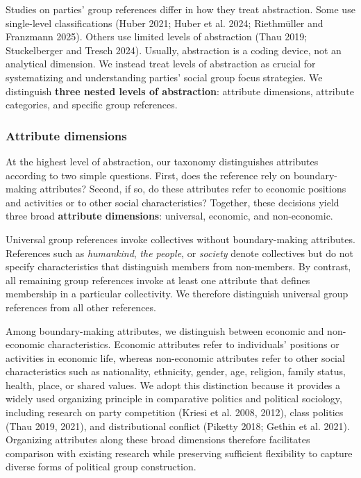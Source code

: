 \documentclass[12pt]{article}
\begin{document}
Studies on parties' group references differ in how they treat abstraction.
Some use single-level classifications (Huber 2021; Huber et al. 2024; Riethmüller and Franzmann 2025).
Others use limited levels of abstraction (Thau 2019; Stuckelberger and Tresch 2024).
Usually, abstraction is a coding device, not an analytical dimension.
We instead treat levels of abstraction as crucial for systematizing and understanding parties' social group focus strategies.
We distinguish \textbf{three nested levels of abstraction}: attribute dimensions, attribute categories, and specific group references.

\subsubsection{Attribute dimensions}\label{attribute-dimensions}

At the highest level of abstraction, our taxonomy distinguishes attributes according to two simple questions.
First, does the reference rely on boundary-making attributes?
Second, if so, do these attributes refer to economic positions and activities or to other social characteristics?
Together, these decisions yield three broad \textbf{attribute dimensions}: universal, economic, and non-economic.

Universal group references invoke collectives without boundary-making attributes.
References such as \emph{humankind}, \emph{the people}, or \emph{society} denote collectives but do not specify characteristics that distinguish members from non-members.
By contrast, all remaining group references invoke at least one attribute that defines membership in a particular collectivity.
We therefore distinguish universal group references from all other references.

Among boundary-making attributes, we distinguish between economic and non-economic characteristics.
Economic attributes refer to individuals' positions or activities in economic life, whereas non-economic attributes refer to other social characteristics such as nationality, ethnicity, gender, age, religion, family status, health, place, or shared values.
We adopt this distinction because it provides a widely used organizing principle in comparative politics and political sociology, including research on party competition (Kriesi et al. 2008, 2012), class politics (Thau 2019, 2021), and distributional conflict (Piketty 2018; Gethin et al. 2021).
Organizing attributes along these broad dimensions therefore facilitates comparison with existing research while preserving sufficient flexibility to capture diverse forms of political group construction.
\end{document}
